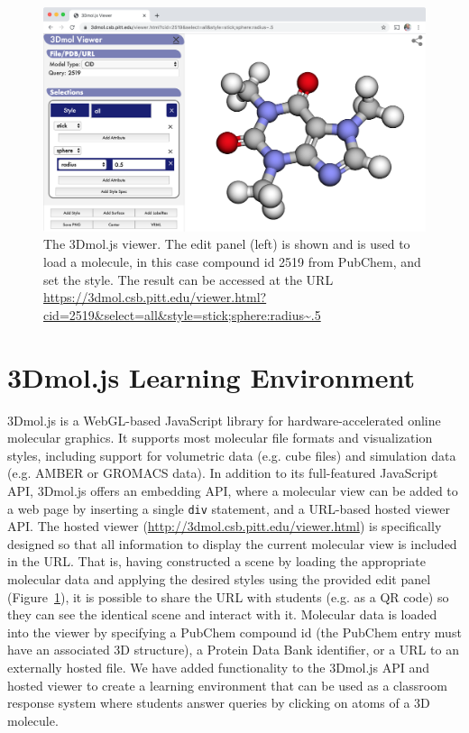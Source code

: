 \documentclass[journal=jceda8,manuscript=article]{achemso}
\begin{document}
\begin{figure}
    \centering
    \includegraphics[width=\linewidth]{viewer}
    \caption{The 3Dmol.js viewer.  The edit panel (left) is shown and is used to load a molecule, in this case compound id 2519 from PubChem, and set the style.  The result can be accessed at the URL \url{https://3dmol.csb.pitt.edu/viewer.html?cid=2519&select=all&style=stick;sphere:radius~.5}}
    \label{fig:viewer}
\end{figure}

\section{3Dmol.js Learning Environment}

3Dmol.js\cite{rego20153dmol} is a WebGL-based JavaScript library for hardware-accelerated online molecular graphics.  It supports most molecular file formats and visualization styles, including support for volumetric data (e.g. cube files) and simulation data (e.g. AMBER\cite{case2005amber} or GROMACS\cite{van2005gromacs} data).  In addition to its full-featured JavaScript API, 3Dmol.js offers an embedding API, where a molecular view can be added to a web page by inserting a single \texttt{div} statement, and a URL-based hosted viewer API. The hosted viewer (\url{http://3dmol.csb.pitt.edu/viewer.html}) is specifically designed so that all information to display the current molecular view is included in the URL.  That is, having constructed a scene by loading the appropriate molecular data and applying the desired styles using the provided edit panel (Figure~\ref{fig:viewer}), it is possible to share the URL with students (e.g. as a QR code) so they can see the identical scene and interact with it.  Molecular data is loaded into the viewer by specifying a PubChem compound id (the PubChem entry must have an associated 3D structure), a Protein Data Bank identifier, or a URL to an externally hosted file.    We have added functionality to the 3Dmol.js API and hosted viewer to create a learning environment that can be used as a classroom response system where students answer queries by clicking on atoms of a 3D molecule.
\end{document}

